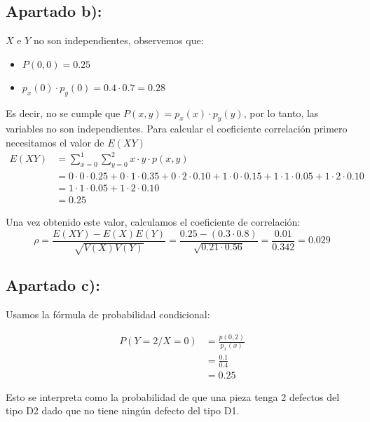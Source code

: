 \documentclass[11pt]{article}
\begin{document}
\subsection*{Apartado b):}

$X$ e $Y$ no son independientes, observemos que:

\begin{itemize}
    \item $ P(0, 0) = 0.25$
    \item $p_x(0) \cdot p_y(0) = 0.4 \cdot 0.7 = 0.28$
\end{itemize}

Es decir, no se cumple que $P(x, y) = p_x(x) \cdot p_y(y)$, por lo tanto, 
las variables no son independientes. 
Para calcular el coeficiente correlación primero necesitamos el valor de $E(XY)$
\begin{align*}
    E(XY) & = \displaystyle\sum_{x = 0}^{1} \displaystyle\sum_{y = 0}^{2} x \cdot y \cdot p(x, y) \\
          & = 0 \cdot 0 \cdot 0.25 + 0 \cdot 1 \cdot 0.35 + 0 \cdot 2 \cdot 0.10
              + 1 \cdot 0 \cdot 0.15 + 1 \cdot 1 \cdot 0.05 + 1 \cdot 2 \cdot 0.10 \\
          & = 1 \cdot 1 \cdot 0.05 + 1 \cdot 2 \cdot 0.10 \\
          & = 0.25
\end{align*}

Una vez obtenido este valor, calculamos el coeficiente de correlación:
\begin{equation*}
    \rho = \frac{E(XY) - E(X)E(Y)}{\sqrt{V(X)V(Y)}} 
         = \frac{0.25 - (0.3 \cdot 0.8)}{\sqrt{0.21 \cdot 0.56}} = \frac{0.01}{0.342} = 0.029
\end{equation*}


\subsection*{Apartado c):}

Usamos la fórmula de probabilidad condicional:

\begin{align*}
    P(Y = 2 / X = 0) & = \frac{p(0, 2)}{p_x(x)} \\
                     & = \frac{0.1}{0.4} \\
                     & = 0.25
\end{align*}

Esto se interpreta como la probabilidad de que una pieza tenga 2 defectos
del tipo D2 dado que no tiene ningún defecto del tipo D1.
\end{document}
